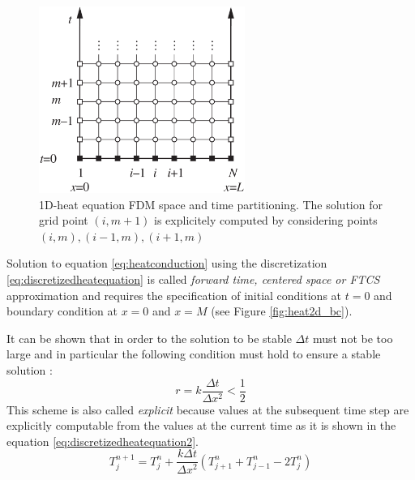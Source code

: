 \begin{figure}
\centering
\includegraphics[width=0.6\textwidth]{./images/CA_FDM/fdmgrid}
\caption[1D-heat equation FDM space and time partitioning]{1D-heat equation FDM space and time partitioning. The solution for  grid point $(i,m+1)$ is explicitely computed by considering points $(i,m),(i-1,m),(i+1,m)$}
\label{fig:heat_equation_time_space_partitioning}
\end{figure}
Solution to equation \ref{eq:heatconduction} using the discretization \ref{eq:discretizedheatequation} is called \textit{forward time, centered space or FTCS} approximation and requires the specification of initial conditions at $t=0$ and boundary condition at $x=0$ and $x=M$ (see Figure \ref{fig:heat2d_bc}).

It can be shown that in order to the solution to be stable $\Delta t$ must not be too large and in particular the following condition must hold to ensure a stable solution \cite{isaacson:1994,anderson:1994,crank:1996}:
\[ 
 r= k \frac{\Delta t}{\Delta x^2}< \frac{1}{2}
\]
This scheme is also called \textit{explicit} because values at the subsequent  time step are explicitly computable from the values at the current time as it is shown in the equation \ref{eq:discretizedheatequation2}.
 \begin{equation}
  T^{n+1}_{j} = T^n_{j} + \frac{k \Delta t}{\Delta x^2} (T^n_{j+1}+T^n_{j-1}-2T^n_{j})
 \label{eq:discretizedheatequation2}
 \end{equation}

